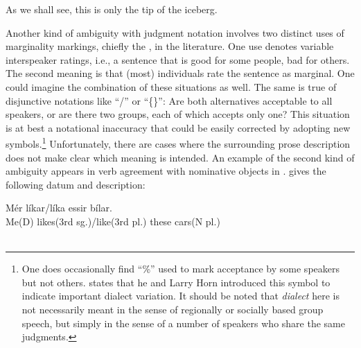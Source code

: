 \noindent
As we shall see, this is only the tip of the iceberg.

Another kind of ambiguity with judgment notation involves two distinct uses of marginality markings, chiefly the , in the literature. One use denotes variable interspeaker ratings, i.e., a sentence that is good for some people, bad for others. The second meaning is that (most) individuals rate the sentence as marginal. One could imagine the combination of these situations as well. The same is true of disjunctive notations like ``/'' or ``\{\}'': Are both alternatives acceptable to all speakers, or are there two groups, each of which accepts only one? This situation is at best a notational inaccuracy that could be easily corrected by adopting new symbols.\footnote{One does occasionally find ``\%'' used to mark acceptance by some speakers but not others. \citet{Neubauer1976} states that he and Larry Horn introduced this symbol to indicate important dialect variation. It should be noted that \textit{dialect} here is not necessarily meant in the sense of regionally or 
socially based group speech, but simply in the sense of a number of speakers who share the same judgments.
}
 Unfortunately, there are cases where the surrounding
prose description does not make clear which meaning is intended. An example of the second kind of ambiguity appears in verb agreement with nominative objects in . \citet{Thrainsson1979} gives the following datum and description:

\ea\label{ex:2:9}
\gll Mér {líkar/líka} {\th}essir bílar.\\
{Me(D)} {likes(3rd sg.)/like(3rd pl.)} these cars(N{ }pl.)\\
\glt [= Thráinsson's (3), p. 466]\\
 \z


